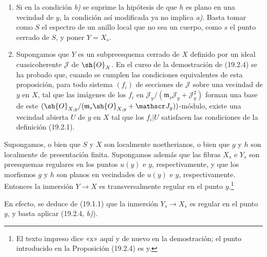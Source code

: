 \begin{remarks}[19.2.5]
\label{IV.19.2.5}
\begin{enumerate}
  \item[(i)] Si en la condición \emph{b)} se suprime la hipótesis de que $h$ es plano en una vecindad de $y$, la condición así modificada ya no implica \emph{a)}. Basta tomar como $S$ el espectro de un anillo local que no sea un cuerpo, como $s$ el punto cerrado de $S$, y poner $Y=X_s$.
  \item[(ii)] Supongamos que $Y$ es un subpreesquema cerrado de $X$ definido por un ideal cuasicoherente $\mathscr J$ de $\sh{O}_X$. En el curso de la demostración de (19.2.4) se ha probado que, cuando se cumplen las condiciones equivalentes de esta proposición, para todo sistema $(f_i)$ de secciones de $\mathscr J$ sobre una vecindad de $y$ en $X$, tal que las imágenes de los $f_i$ en $\mathscr J_y/(\mathfrak m_s\mathscr J_y+\mathscr J_y^2)$ forman una base de este $(\sh{O}_{X,y}/(\mathfrak m_s\sh{O}_{X,y}+\mathscr J_y))$-módulo, existe una vecindad abierta $U$ de $y$ en $X$ tal que los $f_i|U$ satisfacen las condiciones de la definición (19.2.1).
\end{enumerate}
\end{remarks}


\begin{corollary}[19.2.6]
\label{IV.19.2.6}
Supongamos, \textup{o bien} que $S$ y $X$ son localmente noetherianos, \textup{o bien} que $g$ y $h$ son localmente de presentación finita. Supongamos además que las fibras $X_s$ e $Y_s$ son preesquemas regulares en los puntos $u(y)$ e $y$, respectivamente, y que los morfismos $g$ y $h$ son planos en vecindades de $u(y)$ e $y$, respectivamente. Entonces la inmersión $Y\to X$ es transversalmente regular en el punto $y$.\footnote{El texto impreso dice «x» aquí y de nuevo en la demostración; el punto introducido en la Proposición (19.2.4) es y.}
\end{corollary}

En efecto, se deduce de (19.1.1) que la inmersión $Y_s\to X_s$ es regular en el punto $y$, y basta aplicar (19.2.4, \emph{b)}).

